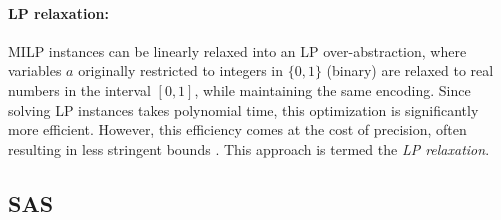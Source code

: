     \fi
    
    
    \paragraph{LP relaxation:}
	MILP instances can be linearly relaxed into an LP over-abstraction, where variables $a$ originally restricted to integers in $\{0,1\}$ (binary) are relaxed to real numbers in the interval $[0,1]$, while maintaining the same encoding. Since solving LP instances takes polynomial time, this optimization is significantly more efficient. However, this efficiency comes at the cost of precision, often resulting in less stringent bounds \cite{DivideAndSlide}. This approach is termed the {\em LP relaxation}.
	
	

	
	
	\iffalse
	\subsection{SAS}
	
